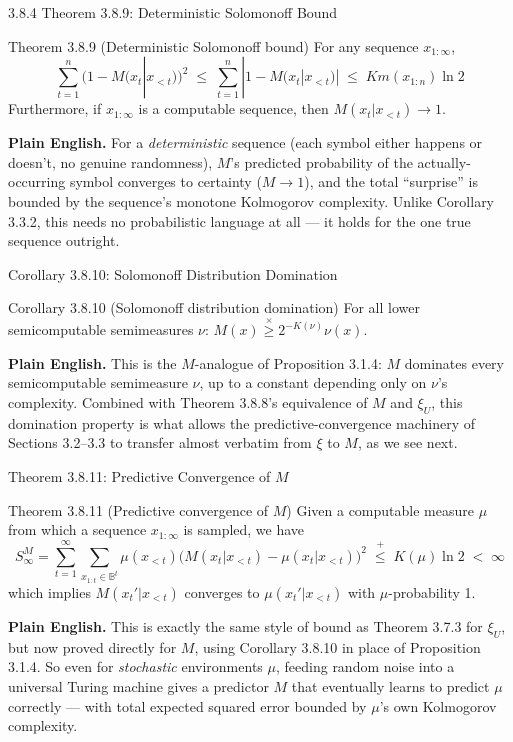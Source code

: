 \documentclass[aspectratio=169,10pt]{beamer}
\newcommand{\B}{\mathbb{B}}
\newcommand{\Km}{Km}
\begin{document}
\begin{frame}{3.8.4 Theorem 3.8.9: Deterministic Solomonoff Bound}
  \begin{block}{Theorem 3.8.9 (Deterministic Solomonoff bound)}
    For any sequence $x_{1:\infty}$,
    \[
      \sum_{t=1}^n (1-M(x_t|x_{<t}))^2 \; \le \; \sum_{t=1}^n |1-M(x_t|x_{<t})| \; \le \; \Km(x_{1:n})\ln 2
    \]
    Furthermore, if $x_{1:\infty}$ is a computable sequence, then
    $M(x_t|x_{<t})\to 1$.
  \end{block}
  \textbf{Plain English.} For a \emph{deterministic} sequence (each symbol
  either happens or doesn't, no genuine randomness), $M$'s predicted
  probability of the actually-occurring symbol converges to certainty
  ($M\to 1$), and the total ``surprise'' is bounded by the sequence's
  monotone Kolmogorov complexity. Unlike Corollary 3.3.2, this needs no
  probabilistic language at all --- it holds for the one true sequence
  outright.
\end{frame}

\begin{frame}{Corollary 3.8.10: Solomonoff Distribution Domination}
  \begin{block}{Corollary 3.8.10 (Solomonoff distribution domination)}
    For all lower semicomputable semimeasures $\nu$: $M(x)\overset{\times}{\ge}2^{-K(\nu)}\nu(x)$.
  \end{block}
  \textbf{Plain English.} This is the $M$-analogue of Proposition 3.1.4:
  $M$ dominates every semicomputable semimeasure $\nu$, up to a constant
  depending only on $\nu$'s complexity. Combined with Theorem 3.8.8's
  equivalence of $M$ and $\xi_U$, this domination property is what allows
  the predictive-convergence machinery of Sections 3.2--3.3 to transfer
  almost verbatim from $\xi$ to $M$, as we see next.
\end{frame}

\begin{frame}{Theorem 3.8.11: Predictive Convergence of $M$}
  \begin{block}{Theorem 3.8.11 (Predictive convergence of $M$)}
    Given a computable measure $\mu$ from which a sequence $x_{1:\infty}$ is
    sampled, we have
    \[
      S_\infty^M = \sum_{t=1}^\infty \sum_{x_{1:t}\in\B^t}\mu(x_{<t})\big(M(x_t|x_{<t})-\mu(x_t|x_{<t})\big)^2 \; \overset{+}{\le} \; K(\mu)\ln 2 \; < \; \infty
    \]
    which implies $M(x_t'|x_{<t})$ converges to $\mu(x_t'|x_{<t})$ with
    $\mu$-probability 1.
  \end{block}
  \textbf{Plain English.} This is exactly the same style of bound as
  Theorem 3.7.3 for $\xi_U$, but now proved directly for $M$, using
  Corollary 3.8.10 in place of Proposition 3.1.4. So even for
  \emph{stochastic} environments $\mu$, feeding random noise into a
  universal Turing machine gives a predictor $M$ that eventually learns
  to predict $\mu$ correctly --- with total expected squared error bounded
  by $\mu$'s own Kolmogorov complexity.
\end{frame}
\end{document}
